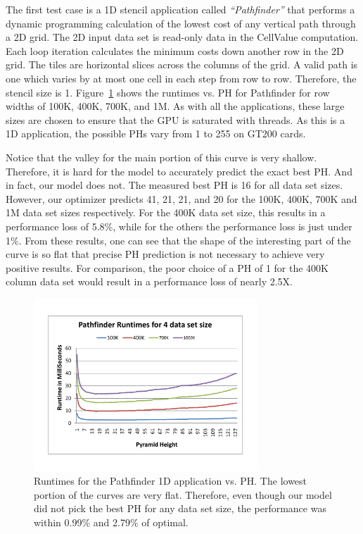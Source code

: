 \documentclass[preprint,nocopyrightspace]{styles/sigplanconf}
\begin{document}
The first test case is a 1D stencil application called {\em ``Pathfinder''} that performs a dynamic programming calculation 
of the lowest cost of any vertical path through a 2D grid.  
The 2D input data set is read-only data in the CellValue computation.  
Each loop iteration calculates the minimum costs down another row in the 2D grid.
The tiles are horizontal slices across the columns of the grid.  
A valid path is one which varies by at most one cell 
in each step from row to row.  Therefore, the stencil size is 1.  
Figure~\ref{fig:pathfinderTimes} shows the runtimes vs. PH for Pathfinder for
row widths of 100K, 400K, 700K, and 1M.  
As with all the applications, these large sizes are chosen to ensure
that the GPU is saturated with threads.  
As this is a 1D application, the possible PHs vary from 1 to 255 on GT200 cards.

Notice that the valley for the main portion of this curve is very shallow.  
Therefore, it is hard for the model to accurately predict the exact best PH.  
And in fact, our model does not.  
The measured best PH is 16 for all data set sizes.
However, our optimizer predicts 41, 21, 21, and 20 for the 100K, 400K, 700K and 1M
data set sizes respectively.
For the 400K data set size, this results in a performance loss of 5.8\%,
while for the others the performance loss is just under 1\%.
From these results, one can see that the shape of the interesting part of the curve 
is so flat that precise PH prediction is not necessary to achieve very positive results.
For comparison, the poor choice of a PH of 1 for the 400K column data set would result 
in a performance loss of nearly 2.5X.
\begin{figure}
\includegraphics[clip,trim=1in 1in 1in 1in,width=3.3in]{figures/PathfinderTimingData}
\caption{Runtimes for the Pathfinder 1D application vs. PH.
The lowest portion of the curves are very flat.  Therefore, even though our model did not 
pick the best PH for any data set size, the performance was within 0.99\% and 2.79\% of optimal.}
\label{fig:pathfinderTimes}
\end{figure}
\end{document}
